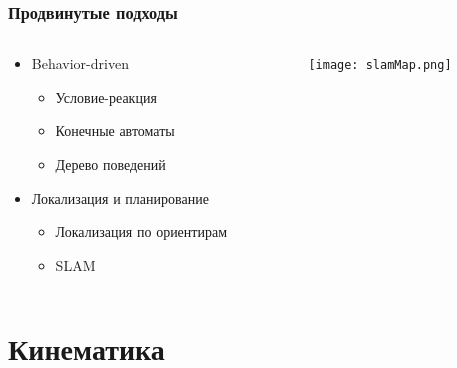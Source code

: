 \documentclass{../../slides-style}
\begin{document}
    \begin{frame}
        \frametitle{Продвинутые подходы}
        \begin{columns}
            \begin{column}{0.5\textwidth}
                \begin{itemize}
                    \item Behavior-driven
                    \begin{itemize}
                        \item Условие-реакция
                        \item Конечные автоматы
                        \item Дерево поведений
                    \end{itemize}
                    \item Локализация и планирование
                    \begin{itemize}
                        \item Локализация по ориентирам
                        \item SLAM
                    \end{itemize}
                \end{itemize}
            \end{column}
            \begin{column}{0.5\textwidth}
                \begin{center}
                    \texttt{[image: slamMap.png]}
                \end{center}
            \end{column}
        \end{columns}
    \end{frame}

    \section{Кинематика}
\end{document}
